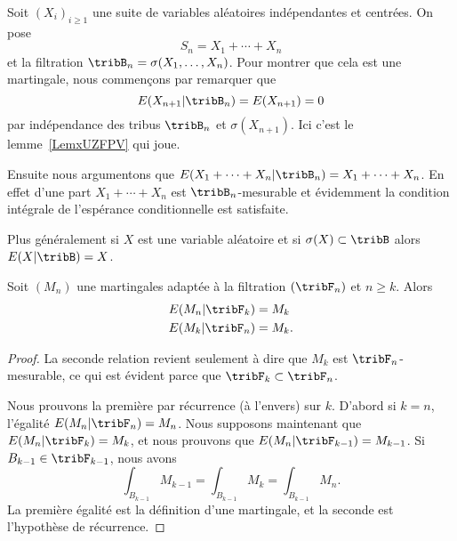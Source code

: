 \begin{example}     \label{ExtFFKTr}
    Soit \( (X_i)_{i\geq 1}\) une suite de variables aléatoires indépendantes et centrées. On pose
    \begin{equation}
        S_n=X_1+\cdots +X_n
    \end{equation}
    et la filtration \( \tribB_n=\sigma(X_1,\ldots, X_n)\). Pour montrer que cela est une martingale, nous commençons par remarquer que
    \begin{equation}
        E(X_{n+1}|\tribB_n)=E(X_{n+1})=0
    \end{equation}
    par indépendance des tribus \( \tribB_n\) et \( \sigma(X_{n+1})\). Ici c'est le lemme~\ref{LemxUZFPV} qui joue.

    Ensuite nous argumentons que \( E(X_1+\cdots +X_n|\tribB_n)=X_1+\cdots +X_n\). En effet d'une part \( X_1+\cdots +X_n\) est \( \tribB_n\)-mesurable et évidemment la condition intégrale de l'espérance conditionnelle est satisfaite.

    Plus généralement si \( X\) est une variable aléatoire et si \( \sigma(X)\subset\tribB\) alors \( E(X|\tribB)=X\).
\end{example}

\begin{lemma}   \label{LemqanhgJ}
    Soit \( (M_n)\) une martingales adaptée à la filtration \( (\tribF_n)\) et \( n\geq k\). Alors
    \begin{subequations}
        \begin{align}
            E(M_n|\tribF_k)&=M_k\\
            E(M_k|\tribF_n)&=M_k.
        \end{align}
    \end{subequations}
\end{lemma}

\begin{proof}
    La seconde relation revient seulement à dire que \( M_k\) est \( \tribF_n\)-mesurable, ce qui est évident parce que \( \tribF_k\subset\tribF_n\).

    Nous prouvons la première par récurrence (à l'envers) sur \( k\). D'abord si \( k=n\), l'égalité \( E(M_n|\tribF_n)=M_n\). Nous supposons maintenant que \( E(M_n|\tribF_k)=M_k\), et nous prouvons que \( E(M_n|\tribF_{k-1})=M_{k-1}\). Si \( B_{k-1}\in \tribF_{k-1}\), nous avons
    \begin{equation}
        \int_{B_{k-1}}M_{k-1}=\int_{B_{k-1}}M_{k}=\int_{B_{k-1}}M_n.
    \end{equation}
    La première égalité est la définition d'une martingale, et la seconde est l'hypothèse de récurrence.
\end{proof}

